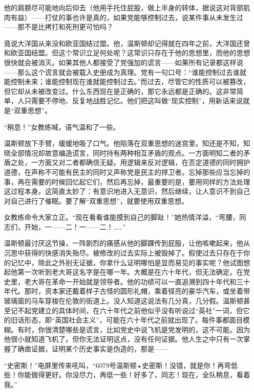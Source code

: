 他的肩膀尽可能地向后仰去（他用手托住屁股，做上半身的转体，据说这对背部肌肉有益）——打仗的事也许是真的，如果党能够控制过去，说某件事从未发生过——那不是比拷打和死刑更可怕吗？

竟说大洋国从来没和欧亚国结过盟。他，温斯顿却记得就在四年之前，大洋国还曾和欧亚国结盟。但这个常识立足何处呢？这常识只存在于他的思想里，而他的思想很快就会被消灭。如果其他人都接受了党强加的谎言——如果所有记录都这样说——那么这个谎言就会被载入史册成为真理。党有一句口号：``谁能控制过去谁就能控制未来；谁能控制现在谁就能控制过去。''而过去，尽管它的性质可以被篡改，但它却从未被改变过。什么东西现在是正确的，那它永远都是正确的。这非常简单，人只需要不停地、反复地战胜记忆。他们把这叫做``现实控制''，用新话来说就是``双重思想''。

``稍息！''女教练喊，语气温和了一些。

温斯顿放下手臂，缓缓地吸了口气。他陷落在双重思想的迷宫里。知还是不知，知晓全部情况却故意编造谎言，同时持有两种相互矛盾的观点。一方面明知二者的矛盾之处，一方面又对二者都确信无疑。用逻辑来反对逻辑，在否定道德的同时拥护道德，在声称不可能有民主的同时又声称党是民主的捍卫者。忘掉那些应当忘掉的事，再在需要的时候回忆起它们，然后再忘掉，最重要的是，要用同样的方法处理这过程本身。这简直太妙了：有意识地进入无意识，然后继续，让人意识不到自己对自己进行了催眠。要了解``双重思想''，就要使用双重思想。

女教练命令大家立正。``现在看看谁能摸到自己的脚趾！''她热情洋溢，``弯腰，同志们，开始，一——二！一——二！\ldots\ldots''

温斯顿最讨厌这节操，一阵剧烈的痛感从他的脚踝传到屁股，让他咳嗽起来，他从沉思中获得的快感消失殆尽。被修改的过去实际上被毁掉了。假使过去只存在于你的记忆中，除此之外别无证据，你拿什么证明哪怕是显而易见的事实呢？他试图想起他第一次听到老大哥这名字是在哪一年。大概是在六十年代，但无法确定。在党史里，老大哥在革命一开始就是领导者。他的功绩可以一直追溯到四十年代和三十年代。那时，资本家还戴着样子古怪的圆形礼帽，乘着锃亮的豪华汽车，或坐着带玻璃窗的马车穿梭在伦敦的街道上。没人知道这说法有几分真，几分假。温斯顿甚至记不起党建立的具体时间，在六十年代之前他似乎没有听说过``英社''一词，但它的旧话形态，即``英国社会主义''，可能在六十年代之前就出现了。每件事都面目模糊。有时，你很清楚哪些是谎言，比如党史中说飞机是党发明的，这不可能。因为他很小就知道飞机了。但你无法证明这点，没有任何证据。他人生之中只有一次掌握了确凿证据，证明某个历史事实是伪造的，那是——

``史密斯！''电屏里传来吼叫，``6079号温斯顿•史密斯！没错，就是你！再弯低些！你能做得更好。你没尽力，再低一些！好多了，同志！现在，全队稍息，看着我。''

